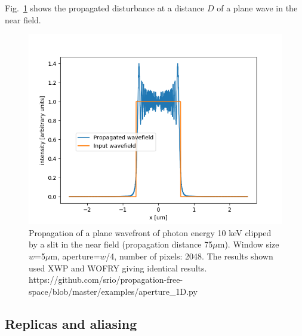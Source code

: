 \documentclass{iucr}              %
\newcommand{\inblue}[1]{{\color{blue}#1}}
\begin{document}
Fig.~\ref{fig: aperture_1D} shows the propagated disturbance at a distance $D$ of a plane wave in the near field.

\begin{figure}
\label{fig: aperture_1D}
\caption{Propagation of a plane wavefront of photon energy 10 keV clipped by a slit in the near field (propagation distance 75$\mu$m). Window size $w$=5$\mu$m, aperture=$w$/4, number of pixels: 2048. 
The results shown used XWP and WOFRY giving identical results. 
\inblue{ https://github.com/srio/propagation-free-space/blob/master/examples/aperture\_1D.py}
}
\includegraphics[width=1\textwidth]{aperture_1D.png}
\end{figure}


\subsection{Replicas and aliasing}
\end{document}
